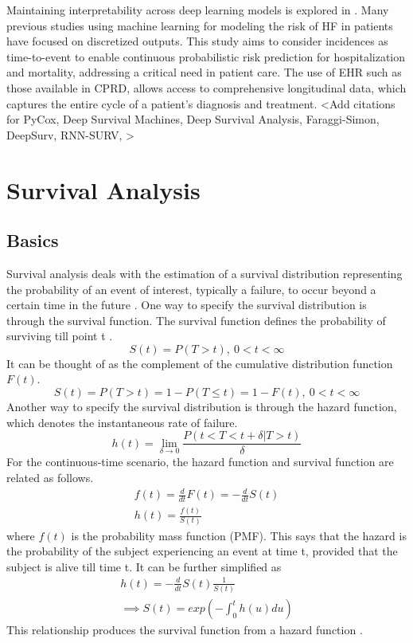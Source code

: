\documentclass[%
 reprint,
 amsmath,amssymb,
 aps,
]{revtex4-2}
\begin{document}
Maintaining interpretability across deep learning models is explored in \cite{caicedo2019iseeu}. Many previous studies using machine learning for modeling the risk of HF in patients have focused on discretized outputs. This study aims to consider incidences as time-to-event to enable continuous probabilistic risk prediction for hospitalization and mortality, addressing a critical need in patient care. The use of EHR such as those available in CPRD, allows access to comprehensive longitudinal data, which captures the entire cycle of a patient's diagnosis and treatment. <Add citations  for PyCox, Deep Survival Machines, Deep Survival Analysis, Faraggi-Simon, DeepSurv, RNN-SURV, >

\section{\label{surv}Survival Analysis}
\subsection{\label{surv_basics}Basics}
Survival analysis deals with the estimation of a survival distribution representing the probability of an event of interest, typically a failure, to occur beyond a certain time in the future \cite{nagpal_deep_2021}. One way to specify the survival distribution is through the survival function. The survival function defines the probability of surviving till point t \cite{Moore_2016}.
\[
S(t) = P(T>t), \ 0 < t <  \infty
\]
It can be thought of as the complement of the cumulative distribution function $F(t)$.
\[
S(t) = P(T>t) = 1 - P(T\le t) = 1 - F(t), \ 0 < t <  \infty
\]
Another way to specify the survival distribution is through the hazard function, which denotes the instantaneous rate of failure.
\[
h(t) = \lim_{\delta\to0}\frac{P(t<T<t+\delta|T>t)}{\delta}
\]
For the continuous-time scenario, the hazard function and survival function are related as follows. 
\begin{gather*}
f(t) = \frac{d}{dt}F(t) = -\frac{d}{dt}S(t)\\
h(t) = \frac{f(t)}{S(t)} 
\end{gather*}
where $f(t)$ is the probability mass function (PMF). This says that the hazard is the probability of the subject experiencing an event at time t, provided that the subject is alive till time t. It can be further simplified as
\begin{gather*}
h(t) = -\frac{d}{dt}S(t)\frac{1}{S(t)}\\
\implies S(t) = exp\left (- \int_{0}^{t}h(u)du\right)
\end{gather*}
This relationship produces the survival function from a hazard function \cite{Moore_2016}.\\
\end{document}
